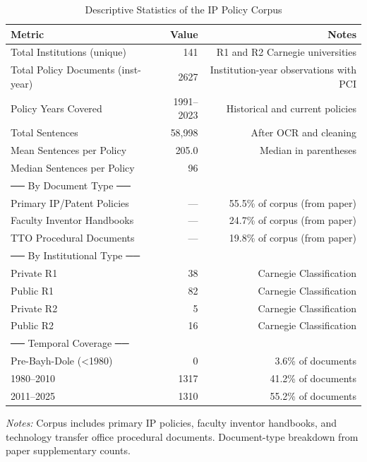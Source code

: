 \begin{table}[H]
\centering
\caption{Descriptive Statistics of the IP Policy Corpus}
\label{tab:table1_corpus}
\begin{threeparttable}
\small
\begin{tabular}{lrr}
\toprule
\textbf{Metric} & \textbf{Value} & \textbf{Notes} \\
\midrule
Total Institutions (unique) & 141 & R1 and R2 Carnegie universities \\
Total Policy Documents (inst-year) & 2627 & Institution-year observations with PCI \\
Policy Years Covered & 1991–2023 & Historical and current policies \\
Total Sentences & 58,998 & After OCR and cleaning \\
Mean Sentences per Policy & 205.0 & Median in parentheses \\
Median Sentences per Policy & 96 &  \\
── By Document Type ── &  &  \\
  Primary IP/Patent Policies & — & 55.5\% of corpus (from paper) \\
  Faculty Inventor Handbooks & — & 24.7\% of corpus (from paper) \\
  TTO Procedural Documents & — & 19.8\% of corpus (from paper) \\
── By Institutional Type ── &  &  \\
  Private R1 & 38 & Carnegie Classification \\
  Public R1 & 82 & Carnegie Classification \\
  Private R2 & 5 & Carnegie Classification \\
  Public R2 & 16 & Carnegie Classification \\
── Temporal Coverage ── &  &  \\
  Pre-Bayh-Dole (<1980) & 0 & 3.6\% of documents \\
  1980–2010 & 1317 & 41.2\% of documents \\
  2011–2025 & 1310 & 55.2\% of documents \\
\bottomrule
\end{tabular}
\begin{tablenotes}\small
\item \textit{Notes:} Corpus includes primary IP policies, faculty inventor handbooks, and technology transfer office procedural documents. Document-type breakdown from paper supplementary counts.
\end{tablenotes}
\end{threeparttable}
\end{table}